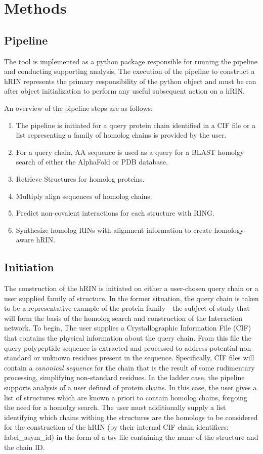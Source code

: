 \section{Methods}

\subsection{Pipeline}
The tool is implemented as a python package responsible for running the pipeline and conducting supporting analysis. 
The execution of the pipeline to construct a hRIN represents the primary responsibility of the python object and must be ran after object initialization to perform any useful subsequent action on a hRIN. %

An overview of the pipeline steps are as follows:
\begin{enumerate}
	\item The pipeline is initiated for a query protein chain identified in a CIF file or a list representing a family of homolog chains is provided by the user.
	\item For a query chain, AA sequence is used as a query for a BLAST homolgy search of either the AlphaFold or PDB database.
	\item Retrieve Structures for homolog proteins.
	\item Multiply align sequences of homolog chains.
	\item Predict non-covalent interactions for each structure with RING.
	\item Synthesize homolog RINs with alignment information to create homology-aware hRIN.
\end{enumerate}


\subsection{Initiation}
The construction of the hRIN is initiated on either a user-chosen query chain or a user supplied family of structure.
In the former situation, the query chain is taken to be a representative example of the protein family - the subject of study that will form the basis of the homolog search and construction of the Interaction network.
To begin, The user supplies a Crystallographic Information File (CIF) that contains the physical information about the query chain. From this file the query polypeptide sequence is extracted and processed to address potential non-standard or unknown residues present in the sequence. Specifically, CIF files will contain a \emph{canonical sequence} for the chain that is the result of some rudimentary processing, simplifying non-standard residues. 
In the ladder case, the pipeline supports analysis of a user defined of protein chains. In this case, the user gives a list of structures which are known a priori to contain homolog chains, forgoing the need for a homolgy search. The user must additionally supply a list identifying which chains withing the structures are the homologs to be considered for the construction of the hRIN (by their internal CIF chain identifiers: label\_asym\_id) in the form of a tsv file containing the name of the structure and the chain ID.

